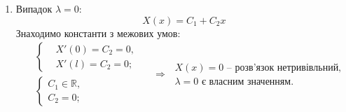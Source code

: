 \begin{enumerate}
\begin{enumerate}[wide, labelindent=0pt]
        \item Випадок $\lambda = 0$:
        \begin{equation*}
            X(x) = C_1 + C_2 x
        \end{equation*}
        Знаходимо константи з межових умов:
        \begin{equation*}
            \begin{aligned}
                &\left\{ \begin{aligned}
                    &X'(0) = C_2 = 0, \\ 
                    &X'(l) = C_2 = 0;
                \end{aligned} \right.
                \\   
                &\left\{ \begin{aligned}
                    C_1 \in \mathbb{R}, \\ 
                    C_2 = 0;
                \end{aligned} \right.
            \end{aligned}
            \quad\Rightarrow\;
            \begin{aligned}
                X(x) = 0 \text{ -- розв'язок нетривівльний,}\\
                \lambda = 0 \text{ є власним значенням.}
            \end{aligned}
        \end{equation*}


\end{enumerate}
\end{enumerate}
